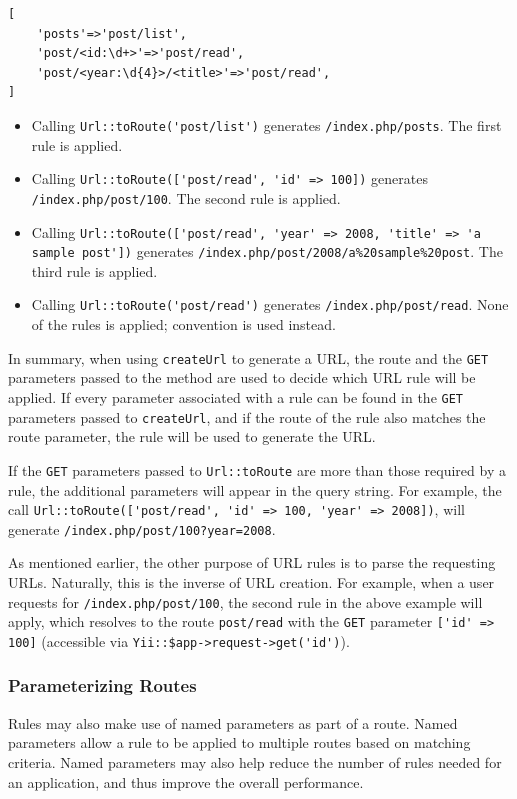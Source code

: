 \lstset{language=php}\begin{lstlisting}
[
    'posts'=>'post/list',
    'post/<id:\d+>'=>'post/read',
    'post/<year:\d{4}>/<title>'=>'post/read',
]
\end{lstlisting}
\begin{itemize}
\item Calling \lstinline|Url::toRoute('post/list')| generates \lstinline|/index.php/posts|. The first rule is applied.
\item Calling \lstinline|Url::toRoute(['post/read', 'id' => 100])| generates \lstinline|/index.php/post/100|. The second rule is applied.
\item Calling \lstinline|Url::toRoute(['post/read', 'year' => 2008, 'title' => 'a sample post'])| generates
\lstinline|/index.php/post/2008/a%20sample%20post|. The third rule is applied.
\item Calling \lstinline|Url::toRoute('post/read')| generates \lstinline|/index.php/post/read|. None of the rules is applied; convention is used instead.
\end{itemize}
In summary, when using \lstinline|createUrl| to generate a URL, the route and the \lstinline|GET| parameters passed to the method are used to
decide which URL rule will be applied. If every parameter associated with a rule can be found in the \lstinline|GET| parameters passed
to \lstinline|createUrl|, and if the route of the rule also matches the route parameter, the rule will be used to generate the URL.

If the \lstinline|GET| parameters passed to \lstinline|Url::toRoute| are more than those required by a rule, the additional parameters will
appear in the query string. For example, the call \lstinline|Url::toRoute(['post/read', 'id' => 100, 'year' => 2008])|, will
generate \lstinline|/index.php/post/100?year=2008|.

As mentioned earlier, the other purpose of URL rules is to parse the requesting URLs. Naturally, this is the inverse of URL creation. For example, when a user requests for \lstinline|/index.php/post/100|, the second rule in the above example
will apply, which resolves to the route \lstinline|post/read| with the \lstinline|GET| parameter \lstinline|['id' => 100]| (accessible via
\lstinline|Yii::$app->request->get('id')|).

\subsubsection{Parameterizing Routes}
Rules may also make use of named parameters as part of a route. Named parameters allow a rule to be applied to multiple routes based
on matching criteria. Named parameters may also help reduce the number of rules needed for an application, and thus improve the overall
performance.

